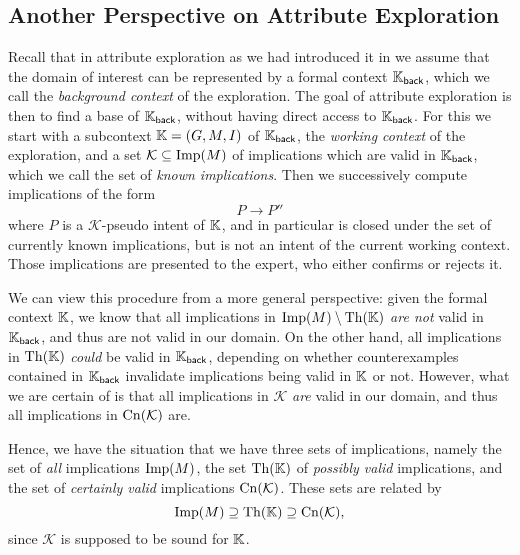 \subsection{Another Perspective on Attribute Exploration}
\label{sec:class-attr-expl}

Recall that in attribute exploration as we had introduced it in  we
assume that the domain of interest can be represented by a formal context ${\mathbb{K}}_{\mathsf{back}}$, which we call the \emph{background context} of the exploration.  The
goal of attribute exploration is then to find a base of ${\mathbb{K}}_{\mathsf{back}}$, without
having direct access to ${\mathbb{K}}_{\mathsf{back}}$.  For this we start with a subcontext
${\mathbb{K}} = (G, M, I)$ of ${\mathbb{K}}_{\mathsf{back}}$, the \emph{working context} of the
exploration, and a set $\mathcal{K} \subseteq \operatorname{Imp}(M)$ of implications which are valid in
${\mathbb{K}}_{\mathsf{back}}$, which we call the set of \emph{known implications}.  Then we
successively compute implications of the form
\begin{equation*}
  P \to P''
\end{equation*}
where $P$ is a $\mathcal{K}$-pseudo intent of ${\mathbb{K}}$, and in particular is closed under
the set of currently known implications, but is not an intent of the current working
context.  Those implications are presented to the expert, who either confirms or rejects
it.

We can view this procedure from a more general perspective: given the formal context
${\mathbb{K}}$, we know that all implications in $\operatorname{Imp}(M) \setminus \operatorname{Th}({\mathbb{K}})$ \emph{are not}
valid in ${\mathbb{K}}_{\mathsf{back}}$, and thus are not valid in our domain.  On the other
hand, all implications in $\operatorname{Th}({\mathbb{K}})$ \emph{could} be valid in ${\mathbb{K}}_{\mathsf{back}}$,
depending on whether counterexamples contained in ${\mathbb{K}}_{\mathsf{back}}$ invalidate
implications being valid in ${\mathbb{K}}$ or not.  However, what we are certain of is that all
implications in $\mathcal{K}$ \emph{are} valid in our domain, and thus all implications in
$\operatorname{Cn}(\mathcal{K})$ are.

Hence, we have the situation that we have three sets of implications, namely the set of
\emph{all} implications $\operatorname{Imp}(M)$, the set $\operatorname{Th}({\mathbb{K}})$ of \emph{possibly valid}
implications, and the set of \emph{certainly valid} implications $\operatorname{Cn}(\mathcal{K})$.
These sets are related by
\begin{equation*}
  \operatorname{Imp}(M) \supseteq \operatorname{Th}({\mathbb{K}}) \supseteq \operatorname{Cn}(\mathcal{K}),
\end{equation*}
since $\mathcal{K}$ is supposed to be sound for ${\mathbb{K}}$.

